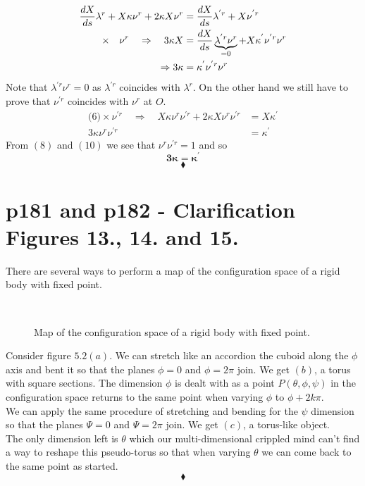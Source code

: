 \begin{align}
\dv{X}{s}\lambda^r +X\kappa\nu^r+ 2\kappa X \nu^r&= \dv{X}{s}\lambda^{'r}+X \nu^{'r}\\
\times \quad\nu^r\quad\Rightarrow\quad3\kappa X &= \dv{X}{s}\underbrace{\lambda^{'r}\nu^r}_{=0}+X \kappa^{'}\nu^{'r}\nu^r\\
\Rightarrow 3\kappa&=\kappa^{'}\nu^{'r}\nu^r
\end{align}
Note that $\lambda^{'r}\nu^r=0$ as $\lambda^{'r}$ coincides with $\lambda^{r}$. On the other hand we still have to prove that $\nu^{'r}$ coincides with $\nu^{r}$ at $O$.
\begin{align}
\text{(6)}\times \nu^{'r}\quad\Rightarrow\quad X\kappa\nu^r\nu^{'r}+2\kappa X \nu^r\nu^{'r}&= X\kappa^{'}\\
3\kappa\nu^r\nu^{'r}&=\kappa^{'}
\end{align}
From $(8)$ and $(10)$ we see that $\nu^r\nu^{'r}=1$ and so 
$$\mathbf{3\kappa=\kappa^{'}}$$
$$\blacklozenge$$
\newpage


\section{p181 and p182 - Clarification Figures 13., 14. and 15.}
\begin{tcolorbox}
There are several ways to perform  a map of the configuration space of a rigid body with fixed point.
\end{tcolorbox}
\begin{figure}[H]
    \centering
    \subfloat[]{}
	\
    \subfloat[]{}
    \qquad
    \subfloat[]{}
\caption{Map of the configuration space of a rigid body with fixed point.}
\label{fig:fig_p181}
\end{figure}
Consider figure $5.2 (a)$. We can stretch like an accordion the cuboid along the $\phi$ axis and bent it so that the planes $\phi=0$ and $\phi=2\pi$ join. We get $(b)$,  a torus with square sections. The dimension $\phi$ is dealt with as a point $P\left( \theta, \phi, \psi \right)$ in the configuration space  returns to the same point when varying $\phi$ to $\phi+2k\pi$.\\
We can apply the same procedure of stretching and bending for the $\psi$ dimension so that the planes $\Psi=0$ and $\Psi=2\pi$ join.
We get $(c)$,  a torus-like object.\\
The only dimension left is $\theta$ which our multi-dimensional crippled mind can't find a way to reshape this pseudo-torus so that when varying $\theta$ we can come back to the same point as started.
$$\blacklozenge$$
\newpage




